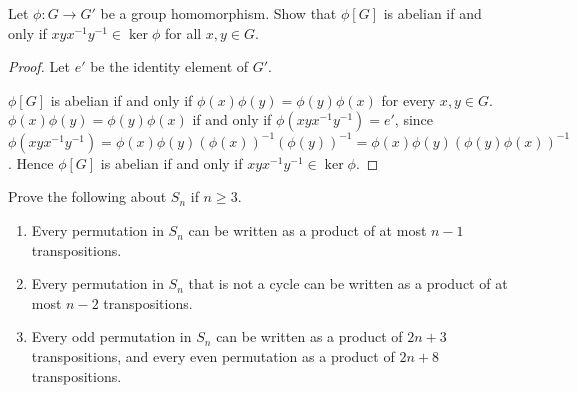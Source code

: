 \begin{exercise}
    Let $\phi: G\to G'$ be a group homomorphism. Show that $\phi[G]$ is abelian if and only if $xyx^{-1}y^{-1}\in \ker\phi$ for all $x,y\in G$.
\end{exercise}

\begin{proof}
    Let $e'$ be the identity element of $G'$.

    $\phi[G]$ is abelian if and only if $\phi(x)\phi(y) = \phi(y)\phi(x)$ for every $x,y\in G$. $\phi(x)\phi(y) = \phi(y)\phi(x)$ if and only if $\phi(xyx^{-1}y^{-1}) = e'$, since $\phi(xyx^{-1}y^{-1}) = \phi(x)\phi(y){(\phi(x))}^{-1}{(\phi(y))}^{-1} = \phi(x)\phi(y){(\phi(y)\phi(x))}^{-1}$. Hence $\phi[G]$ is abelian if and only if $xyx^{-1}y^{-1}\in\ker\phi$.
\end{proof}

\begin{exercise}
    Prove the following about $S_{n}$ if $n\geq 3$.
    \begin{enumerate}[label={\textbf{\alph*.}}]
        \item Every permutation in $S_{n}$ can be written as a product of at most $n - 1$ transpositions.
        \item Every permutation in $S_{n}$ that is not a cycle can be written as a product of at most $n - 2$ transpositions.
        \item Every odd permutation in $S_{n}$ can be written as a product of $2n + 3$ transpositions, and every even permutation as a product of $2n + 8$ transpositions.
    \end{enumerate}
\end{exercise}

